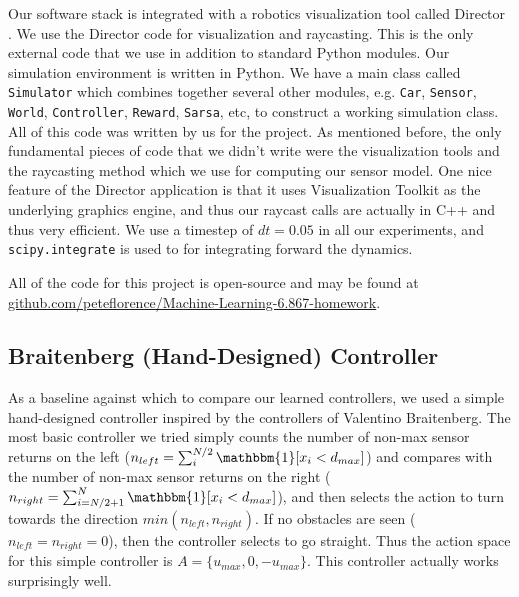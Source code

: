 \documentclass{article}
\def\code#1{\texttt{#1}}
\begin{document}
Our software stack is integrated with a robotics visualization tool called Director \cite{director}. We use the Director code for visualization and raycasting. This is the only external code that we use in addition to standard Python modules. Our simulation environment is written in Python. We have a main class called \code{Simulator} which combines together several other modules, e.g. \code{Car}, \code{Sensor}, \code{World}, \code{Controller}, \code{Reward}, \code{Sarsa}, etc, to construct a working simulation class. All of this code was written by us for the project. As mentioned before, the only fundamental pieces of code that we didn't write were the visualization tools and the raycasting method which we use for computing our sensor model. One nice feature of the Director application is that it uses Visualization Toolkit as the underlying graphics engine, and thus our raycast calls are actually in C++ and thus very efficient. We use a timestep of $dt = 0.05$ in all our experiments, and \code{scipy.integrate} is used to for integrating forward the dynamics.

All of the code for this project is open-source and may be found at \url{github.com/peteflorence/Machine-Learning-6.867-homework}.

\subsection{Braitenberg (Hand-Designed) Controller}
\label{default_controller}
As a baseline against which to compare our learned controllers, we used a simple hand-designed controller inspired by the controllers of Valentino Braitenberg.  The most basic controller we tried simply counts the number of non-max sensor returns on the left ($n_{left} = \sum_i^{N/2} \mathbbm{1}[x_i < d_{max}]$) and compares with the number of non-max sensor returns on the right ($n_{right} = \sum_{i=N/2+1}^N \mathbbm{1}[x_i < d_{max}]$), and then selects the action to turn towards the direction $min(n_{left}, n_{right})$.  If no obstacles are seen ($n_{left} = n_{right} = 0$), then the controller selects to go straight.  Thus the action space for this simple controller is $A = \{u_{max}, 0, -u_{max} \}$.  This controller actually works surprisingly well.
\end{document}
